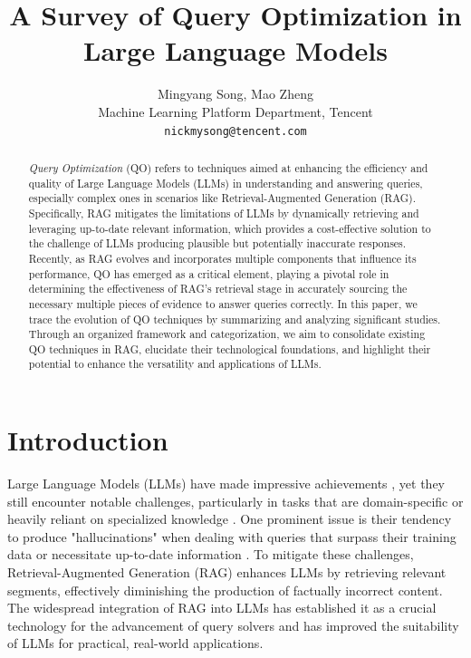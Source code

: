 \documentclass[11pt]{article}
\title{A Survey of Query Optimization in Large Language Models}
\author{Mingyang Song, Mao Zheng\\
	Machine Learning Platform Department, Tencent\\
	{\tt nickmysong@tencent.com} \\
}
\begin{document}
\maketitle
\begin{abstract}
\textit{Query Optimization} (QO) refers to techniques aimed at enhancing the efficiency and quality of Large Language Models (LLMs) in understanding and answering queries, especially complex ones in scenarios like Retrieval-Augmented Generation (RAG). Specifically, RAG mitigates the limitations of LLMs by dynamically retrieving and leveraging up-to-date relevant information, which provides a cost-effective solution to the challenge of LLMs producing plausible but potentially inaccurate responses. Recently, as RAG evolves and incorporates multiple components that influence its performance, QO has emerged as a critical element, playing a pivotal role in determining the effectiveness of RAG's retrieval stage in accurately sourcing the necessary multiple pieces of evidence to answer queries correctly. In this paper,  we trace the evolution of QO techniques by summarizing and analyzing significant studies. Through an organized framework and categorization, we aim to consolidate existing QO techniques in RAG, elucidate their technological foundations, and highlight their potential to enhance the versatility and applications of LLMs.
\end{abstract}

\section{Introduction}
Large Language Models (LLMs) have made impressive achievements \cite{llm_survey}, yet they still encounter notable challenges, particularly in tasks that are domain-specific or heavily reliant on specialized knowledge \cite{survey1,survey2,survey3,survey4,survey5,survey6, survey7, survey8, survey9, survey10, survey11}. One prominent issue is their tendency to produce "hallucinations" when dealing with queries that surpass their training data or necessitate up-to-date information \cite{hallucination1, hallucination2}. To mitigate these challenges, Retrieval-Augmented Generation (RAG) enhances LLMs by retrieving relevant segments, effectively diminishing the production of factually incorrect content. The widespread integration of RAG into LLMs has established it as a crucial technology for the advancement of query solvers and has improved the suitability of LLMs for practical, real-world applications.
\end{document}
